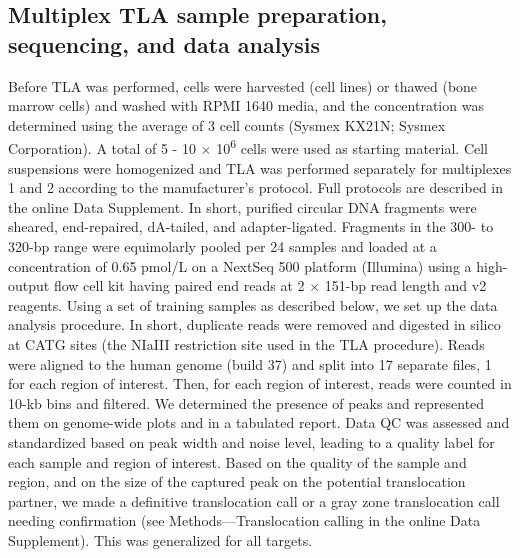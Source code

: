 \subsection[Multiplex TLA methods]{Multiplex TLA sample preparation, sequencing, and data analysis}
Before TLA was performed, cells were harvested (cell lines) or thawed (bone marrow cells) and washed with RPMI 1640 media, and the concentration was determined using the average of 3 cell counts (Sysmex KX21N; Sysmex Corporation). 
A total of 5 - 10 $\times$ 10\textsuperscript{6} cells were used as starting material. 
Cell suspensions were homogenized and TLA was performed separately for multiplexes 1 and 2 according to the manufacturer’s protocol\cite{de_Vree_2014}.
Full protocols are described in the online Data Supplement.
In short, purified circular DNA fragments were sheared, end-repaired, dA-tailed, and adapter-ligated. 
Fragments in the 300- to 320-bp range were equimolarly pooled per 24 samples and loaded at a concentration of 0.65 pmol/L on a NextSeq 500 platform (Illumina) using a high-output flow cell kit having paired end reads at 2 $\times$ 151-bp read length and v2 reagents. 
Using a set of training samples as described below, we set up the data analysis procedure. In short, duplicate reads were removed and digested in silico at CATG sites (the NIaIII restriction site used in the TLA procedure). 
Reads were aligned to the human genome (build 37) and split into 17 separate files, 1 for each region of interest. 
Then, for each region of interest, reads were counted in 10-kb bins and filtered. 
We determined the presence of peaks and represented them on genome-wide plots and in a tabulated report. 
Data QC was assessed and standardized based on peak width and noise level, leading to a quality label for each sample and region of interest. 
Based on the quality of the sample and region, and on the size of the captured peak on the potential translocation partner, we made a definitive translocation call or a gray zone translocation call needing confirmation (see Methods—Translocation calling in the online Data Supplement). 
This was generalized for all targets.

